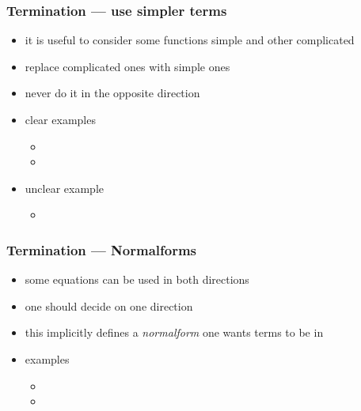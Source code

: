 \begin{frame}
\frametitle{Termination --- use simpler terms}

\begin{itemize}
\item it is useful to consider some functions simple and other complicated
\item replace complicated ones with simple ones
\item never do it in the opposite direction
\item clear examples
\begin{itemize}
\item {}
\item {}
\end{itemize}\medskip
\item unclear example
\begin{itemize}
\item {}
\end{itemize}
\end{itemize}
\end{frame}


\begin{frame}
\frametitle{Termination --- Normalforms}

\begin{itemize}
\item some equations can be used in both directions
\item one should decide on one direction
\item this implicitly defines a \emph{normalform} one wants terms to be in
\item examples
\begin{itemize}
\item {}
\item {}
\end{itemize}
\end{itemize}
\end{frame}

